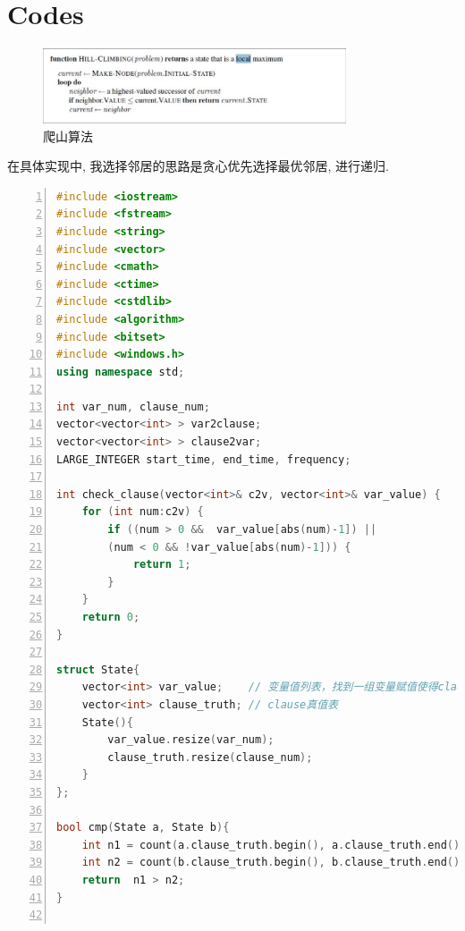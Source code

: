 \documentclass[UTF8]{ctexart}
\begin{document}
\section{Codes}
\begin{figure}[!h]
    \centering
    \includegraphics[width=0.8\textwidth]{../climb.bmp}
    \caption{爬山算法}
\end{figure}
在具体实现中, 我选择邻居的思路是贪心优先选择最优邻居, 进行递归.
\newpage
\begin{lstlisting}[language = C++, numbers=left,numberstyle=\tiny,keywordstyle=\color{blue!70},commentstyle=\color{red!50!green!50!blue!50},frame=shadowbox,rulesepcolor=\color{red!20!green!20!blue!20},basicstyle=\ttfamily]
#include <iostream>
#include <fstream>
#include <string>
#include <vector>
#include <cmath>
#include <ctime>
#include <cstdlib>
#include <algorithm>
#include <bitset>
#include <windows.h>
using namespace std;

int var_num, clause_num;
vector<vector<int> > var2clause;
vector<vector<int> > clause2var;
LARGE_INTEGER start_time, end_time, frequency;

int check_clause(vector<int>& c2v, vector<int>& var_value) {
    for (int num:c2v) {
        if ((num > 0 &&  var_value[abs(num)-1]) || 
        (num < 0 && !var_value[abs(num)-1])) {
            return 1;
        }
    }
    return 0;
}

struct State{
    vector<int> var_value;    // 变量值列表，找到一组变量赋值使得clause真值表全为1
    vector<int> clause_truth; // clause真值表
    State(){
        var_value.resize(var_num);
        clause_truth.resize(clause_num);
    }
};

bool cmp(State a, State b){
    int n1 = count(a.clause_truth.begin(), a.clause_truth.end(), 1);
    int n2 = count(b.clause_truth.begin(), b.clause_truth.end(), 1);
    return  n1 > n2;
}


\end{lstlisting}
\end{document}

